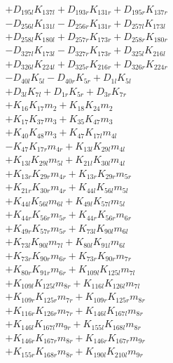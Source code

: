 \begin{multicols}{2}
\begin{align}
&+ D_{195l}K_{137l} + D_{193r}K_{131r} + D_{195r}K_{137r}  \nonumber \\
&- D_{256l}K_{131l} - D_{256r}K_{131r} + D_{257l}K_{173l}  \nonumber \\
&+ D_{258l}K_{180l} + D_{257r}K_{173r} + D_{258r}K_{180r}  \nonumber \\
&- D_{327l}K_{173l} - D_{327r}K_{173r} + D_{325l}K_{216l}  \nonumber \\
&+ D_{326l}K_{224l} + D_{325r}K_{216r} + D_{326r}K_{224r}  \nonumber \\
&- D_{40l}K_{5l} - D_{40r}K_{5r} + D_{1l}K_{5l}  \nonumber \\
&+ D_{3l}K_{7l} + D_{1r}K_{5r} + D_{3r}K_{7r}  \nonumber \\
&+ K_{16}K_{17}m_2 + K_{18}K_{24}m_2  \nonumber \\
&+ K_{17}K_{37}m_3 + K_{35}K_{47}m_3  \nonumber \\
&+ K_{40}K_{48}m_3 + K_{47}K_{17l}m_{4l}  \nonumber \\
&- K_{47}K_{17r}m_{4r} + K_{13l}K_{29l}m_{4l}  \nonumber \\
&+ K_{13l}K_{29l}m_{5l} + K_{21l}K_{30l}m_{4l}  \nonumber \\
&+ K_{13r}K_{29r}m_{4r} + K_{13r}K_{29r}m_{5r}  \nonumber \\
&+ K_{21r}K_{30r}m_{4r} + K_{44l}K_{56l}m_{5l}  \nonumber \\
&+ K_{44l}K_{56l}m_{6l} + K_{49l}K_{57l}m_{5l}  \nonumber \\
&+ K_{44r}K_{56r}m_{5r} + K_{44r}K_{56r}m_{6r}  \nonumber \\
&+ K_{49r}K_{57r}m_{5r} + K_{73l}K_{90l}m_{6l}  \nonumber \\
&+ K_{73l}K_{90l}m_{7l} + K_{80l}K_{91l}m_{6l}  \nonumber \\
&+ K_{73r}K_{90r}m_{6r} + K_{73r}K_{90r}m_{7r}  \nonumber \\
&+ K_{80r}K_{91r}m_{6r} + K_{109l}K_{125l}m_{7l}  \nonumber \\
&+ K_{109l}K_{125l}m_{8r} + K_{116l}K_{126l}m_{7l}  \nonumber \\
&+ K_{109r}K_{125r}m_{7r} + K_{109r}K_{125r}m_{8r}  \nonumber \\
&+ K_{116r}K_{126r}m_{7r} + K_{146l}K_{167l}m_{8r}  \nonumber \\
&+ K_{146l}K_{167l}m_{9r} + K_{155l}K_{168l}m_{8r}  \nonumber \\
&+ K_{146r}K_{167r}m_{8r} + K_{146r}K_{167r}m_{9r}  \nonumber \\
&+ K_{155r}K_{168r}m_{8r} + K_{190l}K_{210l}m_{9r}  \nonumber \\

\end{align}
\end{multicols}

